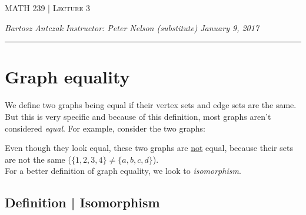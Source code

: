 \documentclass{report}
\newcommand{\lectureNum}{3}
\newcommand{\curDate}{January 9, 2017}
\newcommand{\course}{MATH 239}
\newcommand{\instructor}{Peter Nelson (substitute)}
\begin{document}
\begin{center}
\begin{Large}
\textsc{\course{} | Lecture \lectureNum{}}
\end{Large}
\end{center} 
\noindent \textit{Bartosz Antczak} \hfill
\textit{Instructor: \instructor{}} \hfill
\textit{\curDate{}}
\rule{\textwidth}{0.4pt}

\section{Graph equality}
We define two graphs being equal if their vertex sets and edge sets are the same. But this is very specific and because of this definition, most graphs aren't considered \textit{equal}. For example, consider the two graphs:
\begin{center}
\end{center}
Even though they look equal, these two graphs are \underline{not} equal, because their sets are not the same ($\{1, 2, 3, 4\} \neq \{a, b, c, d\}$).\\
\noindent For a better definition of graph equality, we look to \textit{isomorphism}.
\subsection{Definition | Isomorphism}
\end{document}
